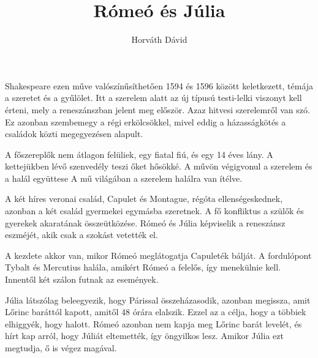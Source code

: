 \documentclass[]{article}
\title{Rómeó és Júlia}
\author{Horváth Dávid}
\begin{document}
	
	\maketitle
	Shakespeare ezen műve valószínűsíthetően 1594 és 1596 között keletkezett, témája a szeretet és a gyűlölet. Itt a szerelem alatt az új típusú testi-lelki viszonyt kell érteni, mely a reneszánszban jelent meg először. Azaz hitvesi szerelemről van szó. Ez azonban  szembemegy a régi erkölcsökkel, mivel eddig a házasságkötés a családok közti megegyezésen alapult.
	
	A főszereplők nem átlagon felüliek, egy fiatal fiú, és egy 14 éves lány. A kettejükben lévő szenvedély teszi őket hősökké. A művön végigvonul a szerelem és a halál együttese A mű világában a szerelem halálra van ítélve.	\cite{erettsegi_com}
	
	A két híres veronai család, Capulet és Montague, régóta ellenségeskednek, azonban a két család gyermekei egymásba szeretnek. A fő konfliktus a szülők és gyerekek akaratának összeütközése. Rómeó és Júlia képviselik a reneszánsz eszméjét, akik csak a szokást vetették el.
		
	A kezdete akkor van, mikor Rómeó meglátogatja Capuleték bálját. A fordulópont Tybalt és Mercutius halála, amikért Rómeó a felelős, így menekülnie kell. Innentől két szálon futnak az események.
	
	Júlia látszólag beleegyezik, hogy Párissal összeházasodik, azonban megissza, amit Lőrinc baráttól kapott, amitől 48 órára elalszik. Ezzel az a célja, hogy a többiek elhiggyék, hogy halott. Rómeó azonban nem kapja meg Lőrinc barát levelét, és hírt kap arról, hogy Júliát eltemették, így öngyilkos lesz. Amikor Júlia ezt megtudja, ő is végez magával.
	\cite{12es}
	
	
\end{document}

